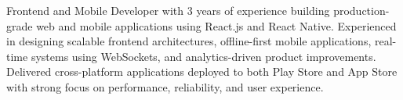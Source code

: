 

Frontend and Mobile Developer with 3 years of experience building production-grade web and mobile applications using React.js and React Native. Experienced in designing scalable frontend architectures, offline-first mobile applications, real-time systems using WebSockets, and analytics-driven product improvements. Delivered cross-platform applications deployed to both Play Store and App Store with strong focus on performance, reliability, and user experience.
